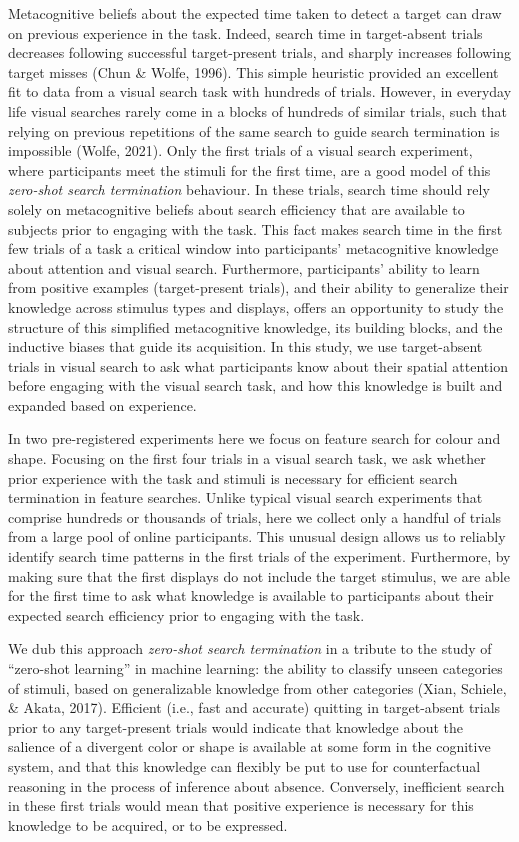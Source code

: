 \documentclass[
  english,
  man]{apa6}
\begin{document}
Metacognitive beliefs about the expected time taken to detect a target can draw on previous experience in the task. Indeed, search time in target-absent trials decreases following successful target-present trials, and sharply increases following target misses (Chun \& Wolfe, 1996). This simple heuristic provided an excellent fit to data from a visual search task with hundreds of trials. However, in everyday life visual searches rarely come in a blocks of hundreds of similar trials, such that relying on previous repetitions of the same search to guide search termination is impossible (Wolfe, 2021). Only the first trials of a visual search experiment, where participants meet the stimuli for the first time, are a good model of this \emph{zero-shot search termination} behaviour. In these trials, search time should rely solely on metacognitive beliefs about search efficiency that are available to subjects prior to engaging with the task. This fact makes search time in the first few trials of a task a critical window into participants' metacognitive knowledge about attention and visual search. Furthermore, participants' ability to learn from positive examples (target-present trials), and their ability to generalize their knowledge across stimulus types and displays, offers an opportunity to study the structure of this simplified metacognitive knowledge, its building blocks, and the inductive biases that guide its acquisition. In this study, we use target-absent trials in visual search to ask what participants know about their spatial attention before engaging with the visual search task, and how this knowledge is built and expanded based on experience.

In two pre-registered experiments here we focus on feature search for colour and shape. Focusing on the first four trials in a visual search task, we ask whether prior experience with the task and stimuli is necessary for efficient search termination in feature searches. Unlike typical visual search experiments that comprise hundreds or thousands of trials, here we collect only a handful of trials from a large pool of online participants. This unusual design allows us to reliably identify search time patterns in the first trials of the experiment. Furthermore, by making sure that the first displays do not include the target stimulus, we are able for the first time to ask what knowledge is available to participants about their expected search efficiency prior to engaging with the task.

We dub this approach \emph{zero-shot search termination} in a tribute to the study of \enquote{zero-shot learning} in machine learning: the ability to classify unseen categories of stimuli, based on generalizable knowledge from other categories (Xian, Schiele, \& Akata, 2017). Efficient (i.e., fast and accurate) quitting in target-absent trials prior to any target-present trials would indicate that knowledge about the salience of a divergent color or shape is available at some form in the cognitive system, and that this knowledge can flexibly be put to use for counterfactual reasoning in the process of inference about absence. Conversely, inefficient search in these first trials would mean that positive experience is necessary for this knowledge to be acquired, or to be expressed.
\end{document}
